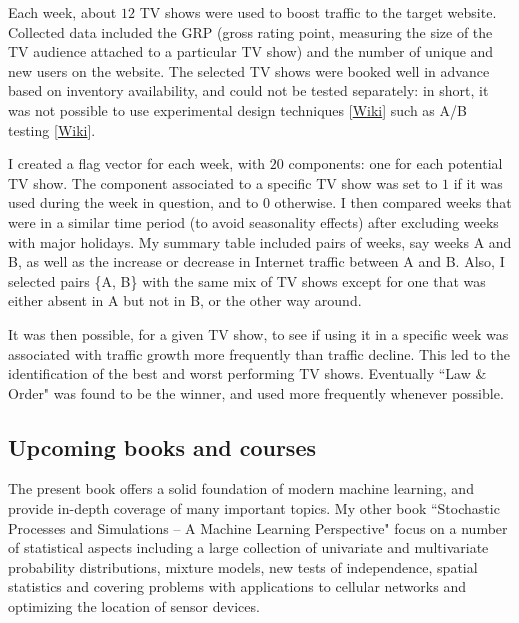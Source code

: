 \documentclass[oneside,10pt]{book}
\begin{document}
Each week, about $12$ TV shows were used to boost traffic to the target website. Collected data included the GRP (gross rating point, measuring the size of the TV audience attached to a particular TV show) and the number of unique and new users on the website. The selected TV shows were booked well in advance based on inventory availability, and could not be tested separately: in short, it was not possible to use \textcolor{index}{experimental design} techniques [\href{https://en.wikipedia.org/wiki/Design_of_experiments}{Wiki}] such as \textcolor{index}{A/B testing} [\href{https://en.wikipedia.org/wiki/A/B_testing}{Wiki}]. 

I created a \textcolor{index}{flag vector} for each week, with $20$ components: one for each potential TV show. The component associated to a specific TV show was set to $1$ if it was used during the week in question, and to $0$ otherwise. I then compared weeks that were in a similar time period (to avoid seasonality effects) after excluding weeks with major holidays.  My summary table included pairs of weeks, say weeks A and B, as well as the increase or decrease in Internet traffic between A and B. Also, I selected pairs \{A,  B\}  with the same mix of TV shows except for one that was either absent in A but not in B, or the other way around.  

It was then possible, for a given TV show, to see if using it in a specific week was associated with traffic growth more frequently than traffic decline. This led to the identification of the best and worst performing TV shows. Eventually ``Law \& Order" was found to be the winner, and used more frequently whenever possible.

\subsection{Upcoming books and courses}

The present book offers a solid foundation of modern machine learning, and provide in-depth coverage of many important topics.  My other book ``Stochastic Processes and Simulations -- A Machine Learning Perspective" \cite{vgsimulnew}  focus on a number of statistical aspects including a large collection of univariate and multivariate probability distributions, mixture models, new tests of independence, spatial statistics and covering problems with applications to cellular networks and optimizing the location of sensor devices.  
\end{document}
